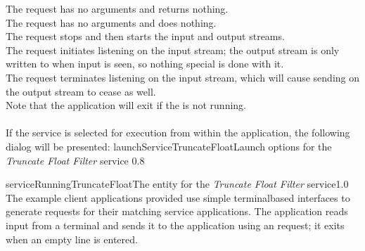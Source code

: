The  request has no arguments and
returns nothing.\\

The  request has no arguments and
does nothing.\\

The  request stops and then
starts the input and output streams.\\

The  request initiates listening
on the input stream; the output stream is only written to when input is seen, so nothing
special is done with it.\\

The  request terminates listening
on the input stream, which will cause sending on the output stream to cease as well.\\

Note that the application will exit if the  is not
running.\\

\insertAppParameters
{}
\insertFilterServiceComment\\

\insertStandardServiceCommands
\condPage{}
If the service is selected for execution from within the \emph{\MMMU} application, the
following dialog will be presented:
%
{launchServiceTruncateFloat}{Launch options for the \emph{Truncate Float Filter} service}%
{0.8}

%
{serviceRunningTruncateFloat}{The \emph{\MMMU} entity for the \emph{Truncate Float Filter}
service}{1.0}
\secondaryEnd
\condPage
{}
The example client applications provided use simple terminal\longDash{}based interfaces to
generate requests for their matching service applications.
The  application reads input from a terminal and
sends it to the  application using an
 request; it exits when an empty line is
entered.\\

